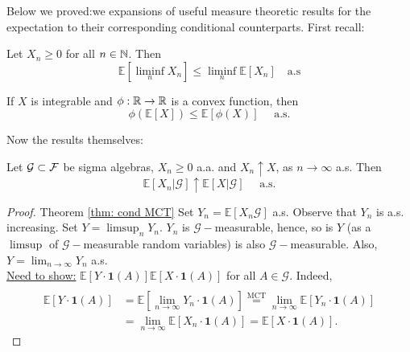 \documentclass{article}
\begin{document}
Below we proved:we expansions of useful measure theoretic results for the expectation to their corresponding conditional counterparts. First recall:
\begin{boxlemma}\label{lemma: Fatou}
Let $  X_{n}\geq 0$ for all $ n\in \mathbb{N}$. Then 
\[
	\mathbb{E}[\displaystyle\liminf_{n}X_{n}]\leq \liminf_{n}\mathbb{E}[X_{n}] \quad \text{a.s}
\]


\end{boxlemma}


\begin{theorem}\label{thm: jensen}
If $ X$ is integrable and $ \phi: \mathbb{R} \to \mathbb{R}$ is a convex function, then 
\[
	\phi(\mathbb{E}[X])\leq\mathbb{E}[\phi(X)]\quad   \text{ a.s.}
\]
\end{theorem}
Now the results themselves:

\begin{theorem}\label{thm: cond MCT}
Let $\mathcal{G}\subset \mathcal{F}$ be sigma algebras, $ X_{n}\geq 0$ a.a. and $ X_{n}\uparrow X$, as $ n\to \infty$ a.s. Then 
\[
	\mathbb{E}[X_{n}|\mathcal{G}]\uparrow\mathbb{E}[X|\mathcal{G}] \quad \text{ a.s.}
\]

\end{theorem}

\begin{proof}{Theorem \ref{thm: cond MCT}}
	Set $ Y_{n} =\mathbb{E}[X_{n}\mathcal{G}]$ a.s. Observe that $ Y_{n}$ is a.s. increasing. Set $ Y = \displaystyle\limsup_{n}Y_{n}$. $ Y_{n}$ is $\mathcal{G}-$measurable, hence, so is $ Y$ (as a $ \displaystyle \limsup $ of $\mathcal{G}-$measurable random variables) is also $\mathcal{G}-$measurable. Also, $ Y = \displaystyle \lim_{n\to \infty}Y_{n} $ a.s.\\ 

	\underline{Need to show:} $\mathbb{E}[Y\cdot\mathbf{1}(A)]\mathbb{E}[X\cdot\mathbf{1}(A)]$ for all $ A\in\mathcal{G}$.	Indeed,
	\[\begin{array}{ll}
	    \\
	    \mathbb{E}[Y\cdot\mathbf{1}(A)] &=\mathbb{E}[ \displaystyle \lim_{n\to \infty }Y_{n}\cdot\mathbf{1}(A) ] \stackrel{\text{MCT}}{=} \displaystyle \lim_{n\to \infty} \mathbb{E}[Y_{n}\cdot\mathbf{1}(A)]\\
																	      &=\displaystyle \lim_{n\to \infty }\mathbb{E}[X_{n}\cdot\mathbf{1}(A)]  =\mathbb{E}[X\cdot\mathbf{1}(A)].
	\end{array}
	\]
	
\end{proof}
\end{document}
